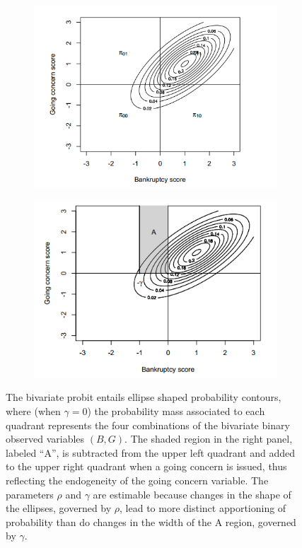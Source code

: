 \documentclass[aoas,preprint, 11pt, dvipsnames, table, x11name]{imsart}
\theoremstyle{remark}
\begin{document}
	\begin{figure}[h]
		\centering
		\begin{subfigure}{.4\textwidth}
			\includegraphics[scale=0.44]{ellipse1}
		\end{subfigure}
		\begin{subfigure}{.4\textwidth}
			\includegraphics[scale=0.515]{ellipse2}
		\end{subfigure}
		\caption{The bivariate probit entails ellipse shaped probability contours, where (when $\gamma=0$) the probability mass associated to each quadrant represents the four combinations of the bivariate binary observed variables $(B, G)$. The shaded region in the right panel, labeled ``A'', is subtracted from the upper left quadrant and added to the upper right quadrant when a going concern is issued, thus reflecting the endogeneity of the going concern variable. The parameters $\rho$ and $\gamma$ are estimable because changes in the shape of the ellipses, governed by $\rho$, lead to more distinct apportioning of probability than do changes in the width of the A region, governed by $\gamma$.}
		\label{ellipse}
	\end{figure}
	
\end{document}
